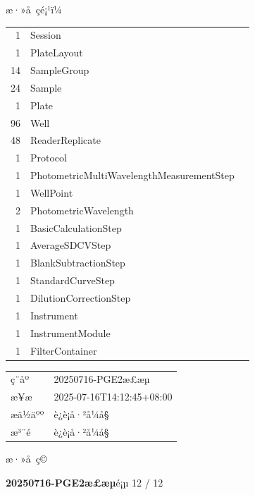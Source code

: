 \documentclass[UTF8,10pt,a4paper,fontset=fandol]{ctexart}
\begin{document}
\noindent
æ·»å çé¡¹ï¼

\begin{tabular}{rll}
1 & Session\\
1 & PlateLayout\\
14 & SampleGroup\\
24 & Sample\\
1 & Plate\\
96 & Well\\
48 & ReaderReplicate\\
1 & Protocol\\
1 & PhotometricMultiWavelengthMeasurementStep\\
1 & WellPoint\\
2 & PhotometricWavelength\\
1 & BasicCalculationStep\\
1 & AverageSDCVStep\\
1 & BlankSubtractionStep\\
1 & StandardCurveStep\\
1 & DilutionCorrectionStep\\
1 & Instrument\\
1 & InstrumentModule\\
1 & FilterContainer
\end{tabular}

\vspace{1em}

\begin{tabular}{@{}ll@{}}
ç¨åº & 20250716-PGE2æ£æµ\\
æ¥æ & 2025-07-16T14:12:45+08:00\\
æä½äºº & è¿è¡å·²å¼å§\\
æ³¨é & è¿è¡å·²å¼å§\\
\end{tabular}

\vspace{0.5em}

\noindent
æ·»å ç©


\newpage

\noindent\textbf{20250716-PGE2æ£æµ}\hfill é¡µ 12 / 12
\end{document}
